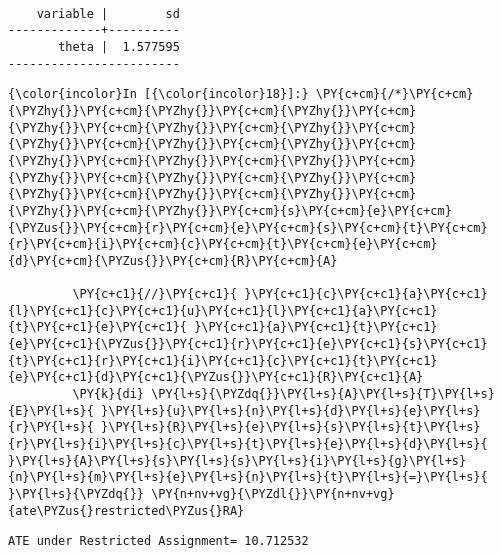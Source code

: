 \documentclass[11pt,notitlepage]{article}\usepackage[]{graphicx}\usepackage[]{color}
\makeatletter
\newenvironment{kframe}{%
 \def\at@end@of@kframe{}%
 \ifinner\ifhmode%
  \def\at@end@of@kframe{\end{minipage}}%
  \begin{minipage}{\columnwidth}%
 \fi\fi%
 \def\FrameCommand##1{\hskip\@totalleftmargin \hskip-\fboxsep
 \colorbox{shadecolor}{##1}\hskip-\fboxsep
     \hskip-\linewidth \hskip-\@totalleftmargin \hskip\columnwidth}%
 \MakeFramed {\advance\hsize-\width
   \@totalleftmargin\z@ \linewidth\hsize
   \@setminipage}}%
 {\par\unskip\endMakeFramed%
 \at@end@of@kframe}
\newenvironment{knitrout}{}{} %
\makeatother
\begin{document}
\begin{enumerate}[a)]
\begin{knitrout}
\begin{kframe}
    \begin{Verbatim}[commandchars=\\\{\}]

    variable |        sd
-------------+----------
       theta |  1.577595
------------------------

    \end{Verbatim}

    \begin{Verbatim}[commandchars=\\\{\}]
{\color{incolor}In [{\color{incolor}18}]:} \PY{c+cm}{/*}\PY{c+cm}{\PYZhy{}}\PY{c+cm}{\PYZhy{}}\PY{c+cm}{\PYZhy{}}\PY{c+cm}{\PYZhy{}}\PY{c+cm}{\PYZhy{}}\PY{c+cm}{\PYZhy{}}\PY{c+cm}{\PYZhy{}}\PY{c+cm}{\PYZhy{}}\PY{c+cm}{\PYZhy{}}\PY{c+cm}{\PYZhy{}}\PY{c+cm}{\PYZhy{}}\PY{c+cm}{\PYZhy{}}\PY{c+cm}{\PYZhy{}}\PY{c+cm}{\PYZhy{}}\PY{c+cm}{\PYZhy{}}\PY{c+cm}{\PYZhy{}}\PY{c+cm}{\PYZhy{}}\PY{c+cm}{\PYZhy{}}\PY{c+cm}{\PYZhy{}}\PY{c+cm}{\PYZhy{}}\PY{c+cm}{s}\PY{c+cm}{e}\PY{c+cm}{\PYZus{}}\PY{c+cm}{r}\PY{c+cm}{e}\PY{c+cm}{s}\PY{c+cm}{t}\PY{c+cm}{r}\PY{c+cm}{i}\PY{c+cm}{c}\PY{c+cm}{t}\PY{c+cm}{e}\PY{c+cm}{d}\PY{c+cm}{\PYZus{}}\PY{c+cm}{R}\PY{c+cm}{A}

         \PY{c+c1}{//}\PY{c+c1}{ }\PY{c+c1}{c}\PY{c+c1}{a}\PY{c+c1}{l}\PY{c+c1}{c}\PY{c+c1}{u}\PY{c+c1}{l}\PY{c+c1}{a}\PY{c+c1}{t}\PY{c+c1}{e}\PY{c+c1}{ }\PY{c+c1}{a}\PY{c+c1}{t}\PY{c+c1}{e}\PY{c+c1}{\PYZus{}}\PY{c+c1}{r}\PY{c+c1}{e}\PY{c+c1}{s}\PY{c+c1}{t}\PY{c+c1}{r}\PY{c+c1}{i}\PY{c+c1}{c}\PY{c+c1}{t}\PY{c+c1}{e}\PY{c+c1}{d}\PY{c+c1}{\PYZus{}}\PY{c+c1}{R}\PY{c+c1}{A}
         \PY{k}{di} \PY{l+s}{\PYZdq{}}\PY{l+s}{A}\PY{l+s}{T}\PY{l+s}{E}\PY{l+s}{ }\PY{l+s}{u}\PY{l+s}{n}\PY{l+s}{d}\PY{l+s}{e}\PY{l+s}{r}\PY{l+s}{ }\PY{l+s}{R}\PY{l+s}{e}\PY{l+s}{s}\PY{l+s}{t}\PY{l+s}{r}\PY{l+s}{i}\PY{l+s}{c}\PY{l+s}{t}\PY{l+s}{e}\PY{l+s}{d}\PY{l+s}{ }\PY{l+s}{A}\PY{l+s}{s}\PY{l+s}{s}\PY{l+s}{i}\PY{l+s}{g}\PY{l+s}{n}\PY{l+s}{m}\PY{l+s}{e}\PY{l+s}{n}\PY{l+s}{t}\PY{l+s}{=}\PY{l+s}{ }\PY{l+s}{\PYZdq{}} \PY{n+nv+vg}{\PYZdl{}}\PY{n+nv+vg}{ate\PYZus{}restricted\PYZus{}RA}
\end{Verbatim}

    \begin{Verbatim}[commandchars=\\\{\}]
ATE under Restricted Assignment= 10.712532
    \end{Verbatim}


\end{kframe}
\end{knitrout}
\end{enumerate}
\end{document}

